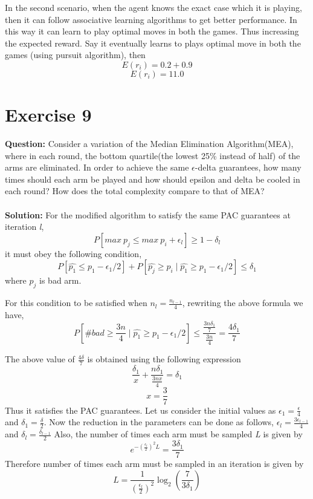 \documentclass[a4paper,10pt]{report}
\begin{document}
In the second scenario, when the agent knows the exact case which it is playing, then it can follow associative learning algorithms to get better performance. In this way it can learn to play optimal moves in both the games. Thus increasing the expected reward. Say it eventually learns to plays optimal move in both the games (using pursuit algorithm), then
\[E(r_i) = 0.2 + 0.9\]
\[E(r_i) = 11.0 \]

\section{Exercise 9}
\textbf{Question:}
Consider a variation of the Median Elimination Algorithm(MEA), where in each round, the bottom quartile(the lowest 25\% instead of half) of the arms are eliminated. In order to achieve the same $\epsilon$-delta guarantees, how many times should each arm be played and how should epsilon and delta be cooled in each round? How does the total complexity compare to that of MEA?
\\\\
\textbf{Solution:}
For the modified algorithm to satisfy the same PAC guarantees at iteration \emph{l},
\[P[max\ p_j \leq max\ p_i + \epsilon_l] \geq 1 - \delta_l\]
it must obey the following condition,
\[P[\hat{p_1} \leq p_1 - \epsilon_1/2] + P[\hat{p_j} \geq p_i \mid \hat{p_1} \geq p_1 - \epsilon_1/2] \leq \delta_1\]
where $p_j$ is bad arm.

For this condition to be satisfied when $n_l = \frac{n_{l-1}}{4}$, rewriting the above formula we have,
\[P[\#bad \geq \frac{3n}{4} \mid \hat{p_1} \geq p_1 - \epsilon_1/2] \leq \frac{\frac{3n\delta_1}{7}}{\frac{3n}{4}} = \frac{4\delta_1}{7}\]

The above value of $\frac{4\delta}{7}$ is obtained using the following expression
\[\frac{\delta_1}{x} + \frac{n\delta_1}{\frac{3nx}{4}} = \delta_1\]
\[x = \frac{3}{7}\]
Thus it satisfies the PAC guarantees.
Let us consider the initial values as $\epsilon_1 = \frac{\epsilon}{4}$ and $\delta_1 = \frac{\delta}{2}$. Now the reduction in the parameters can be done as follows,
$\epsilon_l = \frac{3\epsilon_{l-1}}{4}$ and $\delta_l = \frac{\delta_{l-1}}{2}$
Also, the number of times each arm must be sampled \emph{L} is given by
\[ e^{-(\frac{\epsilon_l}{2})^2L} = \frac{3\delta_1}{7} \]
Therefore number of times each arm must be sampled in an iteration is given by
\[ L = \frac{1}{(\frac{\epsilon_l}{2})^2} \log_2(\frac{7}{3\delta_1}) \]
\end{document}
